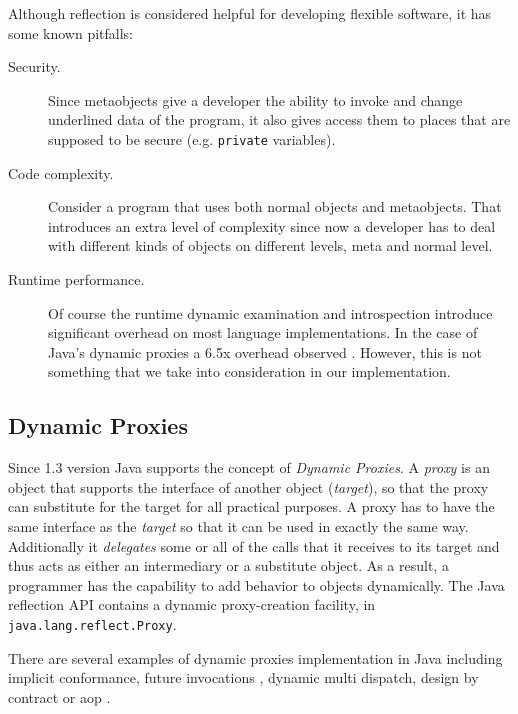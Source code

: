 Although reflection is considered helpful for developing flexible software, it has some known pitfalls:

\begin{description}
	
	\item[Security.] Since metaobjects give a developer the ability to invoke and change underlined data of the program, it also gives access them to places that are supposed to be secure (e.g. \texttt{private} variables).

	\item[Code complexity.] Consider a program that uses both normal objects and metaobjects. 
	That introduces an extra level of complexity since now a developer has to deal with different kinds of objects on different levels, meta and normal level.

	\item[Runtime performance.] Of course the runtime dynamic examination and introspection introduce significant overhead on most language implementations. 
	In the case of Java's dynamic proxies a 6.5x overhead observed \cite{marr2015zero}. 
	However, this is not something that we take into consideration in our implementation.

\end{description}

\subsection{Dynamic Proxies}\label{Dynamic Proxies}
Since 1.3 version Java supports the concept of \textit{Dynamic Proxies}.
A \textit{proxy} is an object that supports the interface of another object (\textit{target}), so that the proxy can substitute for the target for all practical purposes\cite{forman2004java}.
A proxy has to have the same interface as the \textit{target} so that it can be used in exactly the same way. 
Additionally it \textit{delegates} some or all of the calls that it receives to its target and thus acts as either an intermediary or a substitute object.
As a result, a programmer has the capability to add behavior to objects dynamically. 
The Java reflection API contains a dynamic proxy-creation facility, in \texttt{java.lang.reflect.Proxy}.

There are several examples of dynamic proxies implementation in Java including implicit conformance, future invocations \cite{pratikakis2004transparent}, dynamic multi dispatch, design by contract or \ac{aop} \cite{eugster2006uniform}.

